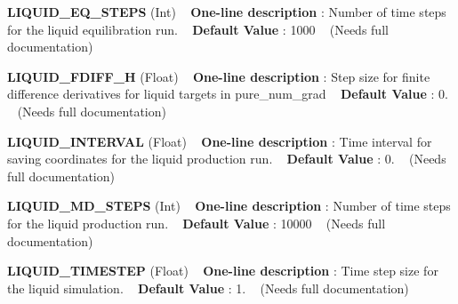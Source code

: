 \begin{DoxyItemize}
\item {\bfseries  L\+I\+Q\+U\+I\+D\+\_\+\+E\+Q\+\_\+\+S\+T\+E\+PS } (Int) ~\newline
{\bfseries  One-\/line description }\+: Number of time steps for the liquid equilibration run. ~\newline
{\bfseries  Default Value }\+: 1000 ~\newline
(Needs full documentation)\end{DoxyItemize}
\begin{DoxyItemize}
\item {\bfseries  L\+I\+Q\+U\+I\+D\+\_\+\+F\+D\+I\+F\+F\+\_\+H } (Float) ~\newline
{\bfseries  One-\/line description }\+: Step size for finite difference derivatives for liquid targets in pure\+\_\+num\+\_\+grad ~\newline
{\bfseries  Default Value }\+: 0. ~\newline
(Needs full documentation)\end{DoxyItemize}
\begin{DoxyItemize}
\item {\bfseries  L\+I\+Q\+U\+I\+D\+\_\+\+I\+N\+T\+E\+R\+V\+AL } (Float) ~\newline
{\bfseries  One-\/line description }\+: Time interval for saving coordinates for the liquid production run. ~\newline
{\bfseries  Default Value }\+: 0. ~\newline
(Needs full documentation)\end{DoxyItemize}
\begin{DoxyItemize}
\item {\bfseries  L\+I\+Q\+U\+I\+D\+\_\+\+M\+D\+\_\+\+S\+T\+E\+PS } (Int) ~\newline
{\bfseries  One-\/line description }\+: Number of time steps for the liquid production run. ~\newline
{\bfseries  Default Value }\+: 10000 ~\newline
(Needs full documentation)\end{DoxyItemize}
\begin{DoxyItemize}
\item {\bfseries  L\+I\+Q\+U\+I\+D\+\_\+\+T\+I\+M\+E\+S\+T\+EP } (Float) ~\newline
{\bfseries  One-\/line description }\+: Time step size for the liquid simulation. ~\newline
{\bfseries  Default Value }\+: 1. ~\newline
(Needs full documentation)\end{DoxyItemize}
